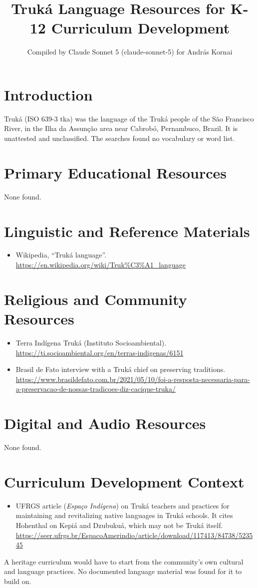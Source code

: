 \documentclass[12pt]{article}
\title{Truk\'a Language Resources for K-12 Curriculum Development}
\author{Compiled by Claude Sonnet 5 (claude-sonnet-5) for Andr\'as Kornai}
\date{}
\begin{document}
\maketitle
\section{Introduction}
Truk\'a (ISO 639-3 tka) was the language of the Truk\'a people of the S\~ao Francisco River, in the Ilha da Assun\c{c}\~ao area near Cabrob\'o, Pernambuco, Brazil. It is unattested and unclassified. The searches found no vocabulary or word list.
\section{Primary Educational Resources}
None found.
\section{Linguistic and Reference Materials}
\begin{itemize}
\item Wikipedia, ``Truk\'a language''. \url{https://en.wikipedia.org/wiki/Truk%C3%A1_language}
\end{itemize}
\section{Religious and Community Resources}
\begin{itemize}
\item Terra Ind\'igena Truk\'a (Instituto Socioambiental). \url{https://ti.socioambiental.org/en/terras-indigenas/6151}
\item Brasil de Fato interview with a Truk\'a chief on preserving traditions. \url{https://www.brasildefato.com.br/2021/05/10/foi-a-resposta-necessaria-para-a-preservacao-de-nossas-tradicoes-diz-cacique-truka/}
\end{itemize}
\section{Digital and Audio Resources}
None found.
\section{Curriculum Development Context}
\begin{itemize}
\item UFRGS article (\emph{Espa\c{c}o Ind\'igena}) on Truk\'a teachers and practices for maintaining and revitalizing native languages in Truk\'a schools. It cites Hohenthal on Kepi\'a and Dzubuku\'a, which may not be Truk\'a itself. \url{https://seer.ufrgs.br/EspacoAmerindio/article/download/117413/84738/523545}
\end{itemize}
A heritage curriculum would have to start from the community's own cultural and language practices. No documented language material was found for it to build on.
\end{document}
